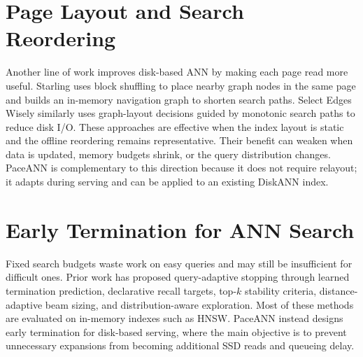 \section{Page Layout and Search Reordering}

Another line of work improves disk-based ANN by making each page read more useful.
Starling uses block shuffling to place nearby graph nodes in the same page and builds an in-memory navigation graph to shorten search paths\cite{wang2024starling}.
Select Edges Wisely similarly uses graph-layout decisions guided by monotonic search paths to reduce disk I/O\cite{yue2025selectedges}.
These approaches are effective when the index layout is static and the offline reordering remains representative.
Their benefit can weaken when data is updated, memory budgets shrink, or the query distribution changes.
PaceANN is complementary to this direction because it does not require relayout; it adapts during serving and can be applied to an existing DiskANN index.

\section{Early Termination for ANN Search}

Fixed search budgets waste work on easy queries and may still be insufficient for difficult ones.
Prior work has proposed query-adaptive stopping through learned termination prediction\cite{li2020adaptiveet}, declarative recall targets\cite{chatzakis2025darth}, top-$k$ stability criteria\cite{teofili2025patience}, distance-adaptive beam sizing\cite{aljazzazi2025dabs}, and distribution-aware exploration\cite{zhang2025distributionaware}.
Most of these methods are evaluated on in-memory indexes such as HNSW.
PaceANN instead designs early termination for disk-based serving, where the main objective is to prevent unnecessary expansions from becoming additional SSD reads and queueing delay.
